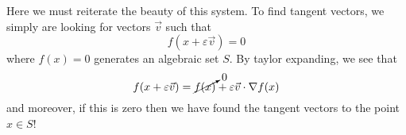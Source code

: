 \documentclass[final]{amsart}
\begin{document}
Here we must reiterate the beauty of this system. To find tangent vectors, we 
simply are looking for vectors $\vec{v}$ such that
\begin{equation}
f(x + \varepsilon\vec{v}) = 0
\end{equation}
where $f(x)=0$ generates an algebraic set $S$. By taylor expanding, we see that
\begin{equation}
f(x + \varepsilon\vec{v}) = \cancelto{0}{f(x)} + \varepsilon\vec{v}\cdot\nabla f(x)
\end{equation}
and moreover, if this is zero then we have found the tangent vectors to the
point $x\in S$!




\appendix




\end{document}
